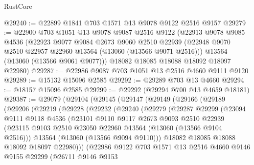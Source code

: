 \begin{lexlean}{RustCore}
\begin{coremodule}
@29240 := @22899 @1841 @703 @1571 @13 @9078 @9122 @2516 @9157
@29279 := @22900
    @703
    @1051
    @13
    @9078
    @9087
    @2516
    @9122
    (@22913
      @9078
      @9085
      @4536
      (@22923
        @9077
        @9084
        @2673
        @9060
        @2510
        @22939
        (@22948 @9070 @2510 @22957 @22960 @13564 (@13060 (@13566 @9071 @2516)))
        @13564
        (@13060 (@13566 @9061 @9077)))
      @18082
      @18085
      @18088
      @18092
      @18097
      @22980)
@29287 := @22986 @9087 @703 @1051 @13 @2516 @4660 @9111 @9120
@29289 := @15132 @15096 @2585
@29292 := @29289 @703 @13 @4660
@29294 := @18157 @15096 @2585
@29299 := @29292 (@29294 @700 @13 @4659 @18181)
@29387 := @29079
    (@29104
      (@29145
        (@29147
          (@29149
            (@29166
              (@29189
                (@29206
                  (@29219
                    (@29228
                      (@29232
                        (@29240
                          (@29279
                            (@29287
                              @29299
                              (@23094
                                @9111
                                @9118
                                @4536
                                (@23101
                                  @9110
                                  @9117
                                  @2673
                                  @9093
                                  @2510
                                  @22939
                                  (@23115
                                    @9103
                                    @2510
                                    @23050
                                    @22960
                                    @13564
                                    (@13060 (@13566 @9104 @2516)))
                                  @13564
                                  (@13060 (@13566 @9094 @9110)))
                                @18082
                                @18085
                                @18088
                                @18092
                                @18097
                                @22980)))
                          (@22986
                            @9122
                            @703
                            @1571
                            @13
                            @2516
                            @4660
                            @9146
                            @9155
                            @29299
                            (@26711
                              @9146
                              @9153

\end{coremodule}
\end{lexlean}
